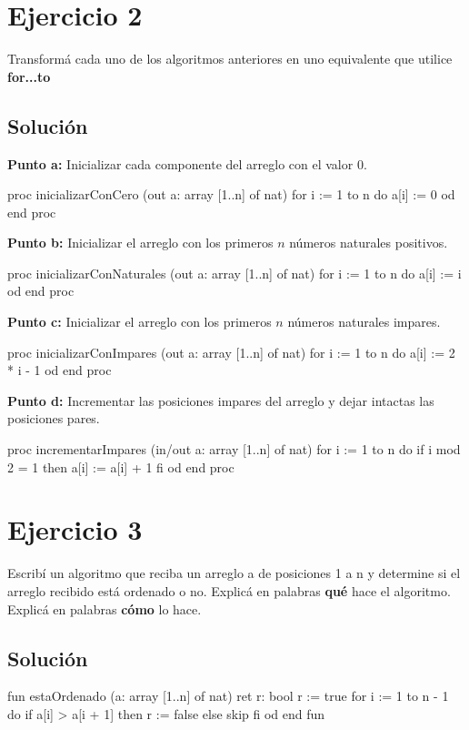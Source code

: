 \documentclass{article}
\begin{document}
\section*{Ejercicio 2}
Transformá cada uno de los algoritmos anteriores en uno equivalente que utilice \textbf{for...to} 
\subsection*{Solución}
\textbf{Punto a:} Inicializar cada componente del arreglo con el valor $0$.
\begin{pascallike}
proc inicializarConCero (out a: array [1..n] of nat)
  for i := 1 to n do
    a[i] := 0
  od
end proc
\end{pascallike}

\textbf{Punto b:} Inicializar el arreglo con los primeros $n$ números naturales positivos.
\begin{pascallike}
proc inicializarConNaturales (out a: array [1..n] of nat)
  for i := 1 to n do
    a[i] := i
  od
end proc
\end{pascallike}

\textbf{Punto c:} Inicializar el arreglo con los primeros $n$ números naturales impares.
\begin{pascallike}
proc inicializarConImpares (out a: array [1..n] of nat)
  for i := 1 to n do
    a[i] := 2 * i - 1
  od
end proc
\end{pascallike}

\textbf{Punto d:} Incrementar las posiciones impares del arreglo y dejar intactas las posiciones pares.
\begin{pascallike}
proc incrementarImpares (in/out a: array [1..n] of nat)
  for i := 1 to n do
    if i mod 2 = 1 then
      a[i] := a[i] + 1
    fi
  od
end proc
\end{pascallike}

\newpage

\section*{Ejercicio 3}
Escribí un algoritmo que reciba un arreglo a de posiciones 1 a n y determine si el arreglo recibido
está ordenado o no. Explicá en palabras \textbf{qué} hace el algoritmo. Explicá en palabras \textbf{cómo} lo hace.

\subsection*{Solución}
\begin{pascallike}
fun estaOrdenado (a: array [1..n] of nat) ret r: bool
  r := true
  for i := 1 to n - 1 do
    if a[i] > a[i + 1] then
      r := false
    else
      skip
    fi
  od
end fun
\end{pascallike}
\end{document}
